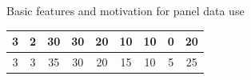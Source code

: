 \documentclass[usenames,dvipsnames]{beamer}
\begin{document}
\begin{frame}{Basic features and motivation for panel data use}
\begin{table}[]
{\begin{tabular}{|c|c|c|c|c|c|c|c|c|}
3   & 2    & 30       & 30                                                        & 20                                                     & 10                                                          & 10                                                          & 0                                                          & 20                                                                      \\ \hline
3   & 3    & 35       & 30                                                        & 20                                                     & 15                                                          & 10                                                          & 5                                                          & 25                                                                      \\ \hline
\end{tabular}}
\end{table}
\end{frame}
\end{document}
